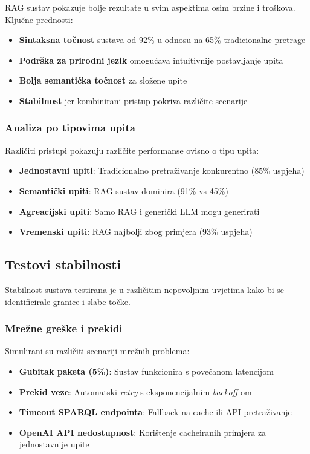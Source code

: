 RAG sustav pokazuje bolje rezultate u svim aspektima osim brzine i troškova. Ključne prednosti:

\begin{itemize}
    \item \textbf{Sintaksna točnost} sustava od 92\% u odnosu na 65\% tradicionalne pretrage
    \item \textbf{Podrška za prirodni jezik} omogućava intuitivnije postavljanje upita
    \item \textbf{Bolja semantička točnost} za složene upite
    \item \textbf{Stabilnost} jer kombinirani pristup pokriva različite scenarije
\end{itemize}

\subsubsection{Analiza po tipovima upita}

Različiti pristupi pokazuju različite performanse ovisno o tipu upita:

\begin{itemize}
    \item \textbf{Jednostavni upiti}: Tradicionalno pretraživanje konkurentno (85\% uspjeha)
    \item \textbf{Semantički upiti}: RAG sustav dominira (91\% vs 45\%)
    \item \textbf{Agreacijski upiti}: Samo RAG i generički LLM mogu generirati
    \item \textbf{Vremenski upiti}: RAG najbolji zbog primjera (93\% uspjeha)
\end{itemize}

\subsection{Testovi stabilnosti}

Stabilnost sustava testirana je u različitim nepovoljnim uvjetima kako bi se identificirale granice i slabe točke.

\subsubsection{Mrežne greške i prekidi}

Simulirani su različiti scenariji mrežnih problema:

\begin{itemize}
    \item \textbf{Gubitak paketa (5\%)}: Sustav funkcionira s povećanom latencijom
    \item \textbf{Prekid veze}: Automatski \textit{retry} s eksponencijalnim \textit{backoff}-om
    \item \textbf{Timeout SPARQL endpointa}: Fallback na cache ili API pretraživanje
    \item \textbf{OpenAI API nedostupnost}: Korištenje cacheiranih primjera za jednostavnije upite
\end{itemize}


